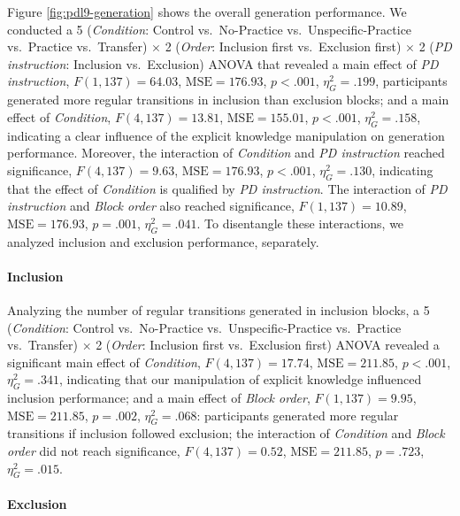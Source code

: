 \documentclass[jou]{apa6}
\theoremstyle{definition}
\theoremstyle{definition}
\theoremstyle{definition}
\theoremstyle{remark}
\begin{document}
Figure \ref{fig:pdl9-generation} shows the overall generation
performance. We conducted a 5 (\emph{Condition}: Control vs.~No-Practice
vs.~Unspecific-Practice vs.~Practice vs.~Transfer) \(\times\) 2
(\emph{Order}: Inclusion first vs.~Exclusion first) \(\times\) 2
(\emph{PD instruction}: Inclusion vs.~Exclusion) ANOVA that revealed a
main effect of \emph{PD instruction}, \(F(1, 137) = 64.03\),
\(\mathrm{MSE} = 176.93\), \(p < .001\), \(\eta^2_G = .199\),
participants generated more regular transitions in inclusion than
exclusion blocks; and a main effect of \emph{Condition},
\(F(4, 137) = 13.81\), \(\mathrm{MSE} = 155.01\), \(p < .001\),
\(\eta^2_G = .158\), indicating a clear influence of the explicit
knowledge manipulation on generation performance. Moreover, the
interaction of \emph{Condition} and \emph{PD instruction} reached
significance, \(F(4, 137) = 9.63\), \(\mathrm{MSE} = 176.93\),
\(p < .001\), \(\eta^2_G = .130\), indicating that the effect of
\emph{Condition} is qualified by \emph{PD instruction}. The interaction
of \emph{PD instruction} and \emph{Block order} also reached
significance, \(F(1, 137) = 10.89\), \(\mathrm{MSE} = 176.93\),
\(p = .001\), \(\eta^2_G = .041\). To disentangle these interactions, we
analyzed inclusion and exclusion performance, separately.

\paragraph{Inclusion}\label{inclusion}

Analyzing the number of regular transitions generated in inclusion
blocks, a 5 (\emph{Condition}: Control vs.~No-Practice
vs.~Unspecific-Practice vs.~Practice vs.~Transfer) \(\times\) 2
(\emph{Order}: Inclusion first vs.~Exclusion first) ANOVA revealed a
significant main effect of \emph{Condition}, \(F(4, 137) = 17.74\),
\(\mathrm{MSE} = 211.85\), \(p < .001\), \(\eta^2_G = .341\), indicating
that our manipulation of explicit knowledge influenced inclusion
performance; and a main effect of \emph{Block order},
\(F(1, 137) = 9.95\), \(\mathrm{MSE} = 211.85\), \(p = .002\),
\(\eta^2_G = .068\): participants generated more regular transitions if
inclusion followed exclusion; the interaction of \emph{Condition} and
\emph{Block order} did not reach significance, \(F(4, 137) = 0.52\),
\(\mathrm{MSE} = 211.85\), \(p = .723\), \(\eta^2_G = .015\).

\paragraph{Exclusion}\label{exclusion}
\end{document}
